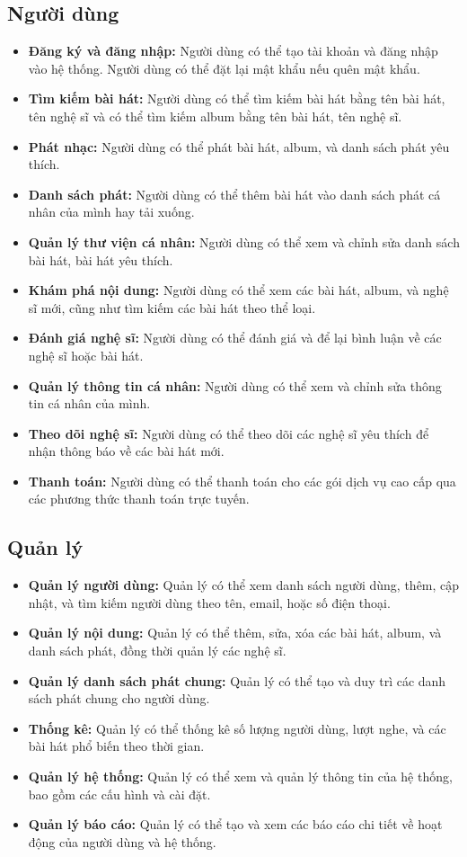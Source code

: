 \subsection{Người dùng}
\begin{itemize}
    \item \textbf{Đăng ký và đăng nhập:} Người dùng có thể tạo tài khoản và đăng nhập vào hệ thống. Người dùng có thể đặt lại mật khẩu nếu quên mật khẩu.
    \item \textbf{Tìm kiếm bài hát:} Người dùng có thể tìm kiếm bài hát bằng tên bài hát, tên nghệ sĩ và có thể tìm kiếm album bằng tên bài hát, tên nghệ sĩ.
    \item \textbf{Phát nhạc:} Người dùng có thể phát bài hát, album, và danh sách phát yêu thích.
    \item \textbf{Danh sách phát:} Người dùng có thể thêm bài hát vào danh sách phát cá nhân của mình hay tải xuống.
    \item \textbf{Quản lý thư viện cá nhân:} Người dùng có thể xem và chỉnh sửa danh sách bài hát, bài hát yêu thích.
    \item \textbf{Khám phá nội dung:} Người dùng có thể xem các bài hát, album, và nghệ sĩ mới, cũng như tìm kiếm các bài hát theo thể loại.
    \item \textbf{Đánh giá nghệ sĩ:} Người dùng có thể đánh giá và để lại bình luận về các nghệ sĩ hoặc bài hát.
    \item \textbf{Quản lý thông tin cá nhân:} Người dùng có thể xem và chỉnh sửa thông tin cá nhân của mình.
    \item \textbf{Theo dõi nghệ sĩ:} Người dùng có thể theo dõi các nghệ sĩ yêu thích để nhận thông báo về các bài hát mới.
    \item \textbf{Thanh toán:} Người dùng có thể thanh toán cho các gói dịch vụ cao cấp qua các phương thức thanh toán trực tuyến.
\end{itemize}

\subsection{Quản lý}
\begin{itemize}
    \item \textbf{Quản lý người dùng:} Quản lý có thể xem danh sách người dùng, thêm, cập nhật, và tìm kiếm người dùng theo tên, email, hoặc số điện thoại.
    \item \textbf{Quản lý nội dung:} Quản lý có thể thêm, sửa, xóa các bài hát, album, và danh sách phát, đồng thời quản lý các nghệ sĩ.
    \item \textbf{Quản lý danh sách phát chung:} Quản lý có thể tạo và duy trì các danh sách phát chung cho người dùng.
    \item \textbf{Thống kê:} Quản lý có thể thống kê số lượng người dùng, lượt nghe, và các bài hát phổ biến theo thời gian.
    \item \textbf{Quản lý hệ thống:} Quản lý có thể xem và quản lý thông tin của hệ thống, bao gồm các cấu hình và cài đặt.
    \item \textbf{Quản lý báo cáo:} Quản lý có thể tạo và xem các báo cáo chi tiết về hoạt động của người dùng và hệ thống.
\end{itemize}